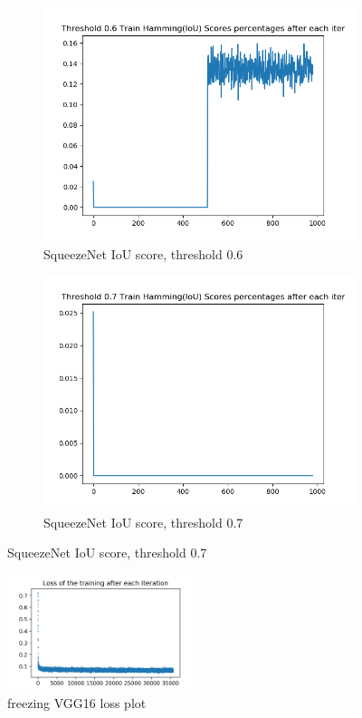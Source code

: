 \documentclass[12pt]{article}
\begin{document}
\begin{figure}[!ht]
\centering
\begin{subfigure}{.5\textwidth}
	\centering
	\includegraphics[width=0.9\linewidth]{squeezenet-lazy-1-train-scores-hs-6.png}
	\caption{\label{squeezenet:squeezenet-lazy-1-train-scores-hs-6}SqueezeNet IoU score, threshold 0.6}
\end{subfigure}%
\begin{subfigure}{.5\textwidth}
	\centering
	\includegraphics[width=0.9\linewidth]{squeezenet-lazy-1-train-scores-hs-7.png}
	\caption{\label{squeezenet:squeezenet-lazy-1-train-scores-hs-7}SqueezeNet IoU score, threshold 0.7}
\end{subfigure}
\end{figure}

\begin{figure}[!ht]
\centering
\includegraphics[width=0.5\textwidth]{vgg16-0_26-lazy-1-train-loss.png}
\caption{\label{vgg16:vgg16-ft-train-loss}freezing VGG16 loss plot}
\end{figure}
\end{document}
